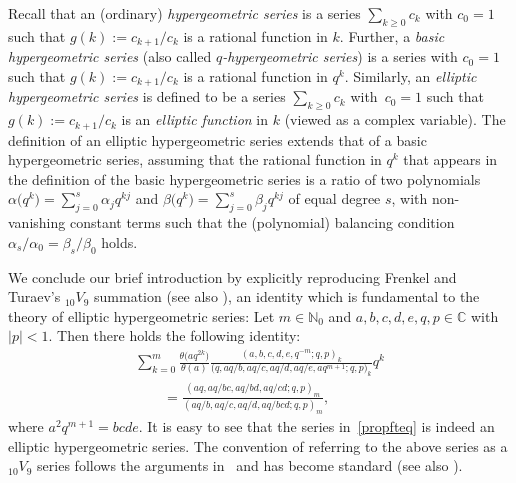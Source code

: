 \documentclass[pdftex]{sigma}
\numberwithin{equation}{section}
\theoremstyle{definition}
\newcommand{\ta}{\theta}
\newcommand{\C}{\mathbb C}
\newcommand{\N}{\mathbb N}
\begin{document}
Recall that an (ordinary) \textit{hypergeometric series} is
a series $\sum_{k\ge 0}c_k$ with $c_0=1$ such that $g(k):=c_{k+1}/c_k$
is a rational function in $k$. Further, a \textit{basic hypergeometric series}
(also called \textit{$q$-hypergeometric series}) is
a series  with $c_0=1$ such that $g(k):=c_{k+1}/c_k$
is a rational function in $q^k$. Similarly, an \textit{elliptic
hypergeometric series} is defined to be a series $\sum_{k\ge 0}c_k$
with~${c_0=1}$ such that $g(k):=c_{k+1}/c_k$ is an \textit{elliptic function}
in $k$ (viewed as a complex variable).
The definition of an elliptic hypergeometric series extends that
of a basic hypergeometric series, assuming that
the rational function in $q^k$ that appears in the definition
of the basic hypergeometric series is a ratio
of two polynomials $\alpha\bigl(q^k\bigr)=\sum_{j=0}^s\alpha_jq^{kj}$ and
$\beta\bigl(q^k\bigr)=\sum_{j=0}^s\beta_jq^{kj}$
of equal degree $s$, with non-vanishing constant terms
such that the (polynomial) balancing condition~${\alpha_s/\alpha_0
=\beta_s/\beta_0}$ holds.


We conclude our brief introduction by explicitly reproducing
Frenkel and Turaev's ${}_{10}V_9$ summation \cite{FT}
(see also \cite[equation~(11.4.1)]{GR}),
an identity which is fundamental to the
theory of elliptic hypergeometric series:
Let $m\in\N_0$ and $a,b,c,d,e,q,p\in\C$ with $|p|<1$.
Then there holds the following identity:
\begin{gather}
\sum_{k=0}^m\frac{\ta\bigl(aq^{2k}\bigr)}{\ta(a)}
\frac{(a,b,c,d,e,q^{-m};q,p)_k}
{\bigl(q,aq/b,aq/c,aq/d,aq/e,aq^{m+1};q,p\bigr)_k}q^k\nonumber\\
\qquad
=\frac{(aq,aq/bc,aq/bd,aq/cd;q,p)_m}
{(aq/b,aq/c,aq/d,aq/bcd;q,p)_m},\label{propfteq}
\end{gather}
where $a^2q^{m+1}=bcde$.
It is easy to see that the series in~\eqref{propfteq}
is indeed an elliptic hypergeometric series.
The convention of referring to the above series as a
${}_{10}V_9$ series follows the arguments
in~\cite{Sp02b} and has become standard
(see also \cite[Chapter~11]{GR}).
\end{document}

